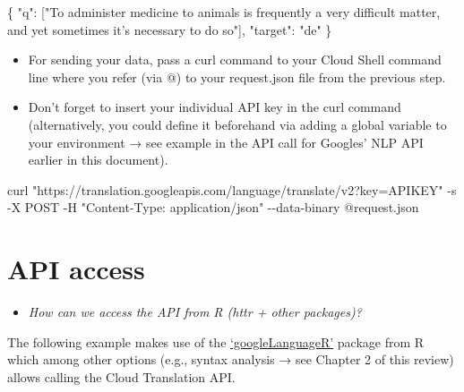 \documentclass[
]{book}
\newenvironment{Shaded}{\begin{snugshade}}{\end{snugshade}}
\newcommand{\NormalTok}[1]{#1}
\newcommand{\SpecialCharTok}[1]{\textcolor[rgb]{0.00,0.00,0.00}{#1}}
\newcommand{\StringTok}[1]{\textcolor[rgb]{0.31,0.60,0.02}{#1}}
\providecommand{\tightlist}{%
  \setlength{\itemsep}{0pt}\setlength{\parskip}{0pt}}
\begin{document}
\begin{Shaded}
\begin{Highlighting}[]
\NormalTok{\{}
 \StringTok{"q"}\SpecialCharTok{:}\NormalTok{ [}\StringTok{"To administer medicine to animals is frequently a very difficult matter, and yet sometimes it’s necessary to do so"}\NormalTok{], }
\StringTok{"target"}\SpecialCharTok{:} \StringTok{"de"}
\NormalTok{\}}
\end{Highlighting}
\end{Shaded}

\begin{itemize}
\item
  For sending your data, pass a curl command to your Cloud Shell command line where you refer (via @) to your request.json file from the previous step.
\item
  Don't forget to insert your individual API key in the curl command (alternatively, you could define it beforehand via adding a global variable to your environment → see example in the API call for Googles' NLP API earlier in this document).
\end{itemize}

\begin{Shaded}
\begin{Highlighting}[]
\NormalTok{curl }\StringTok{"https://translation.googleapis.com/language/translate/v2?key=APIKEY"} \SpecialCharTok{{-}}\NormalTok{s }\SpecialCharTok{{-}}\NormalTok{X POST }\SpecialCharTok{{-}}\NormalTok{H }\StringTok{"Content{-}Type: application/json"} \SpecialCharTok{{-}{-}}\NormalTok{data}\SpecialCharTok{{-}}\NormalTok{binary }\SpecialCharTok{@}\NormalTok{request.json}
\end{Highlighting}
\end{Shaded}

\hypertarget{api-access-1}{%
\section{API access}\label{api-access-1}}

\begin{itemize}
\tightlist
\item
  \emph{How can we access the API from R (httr + other packages)?}
\end{itemize}

The following example makes use of the \href{\%22https://cran.r-project.org/web/packages/googleLanguageR/index.html\%22}{`googleLanguageR'} package from R which among other options (e.g., syntax analysis → see Chapter 2 of this review) allows calling the Cloud Translation API.
\end{document}
